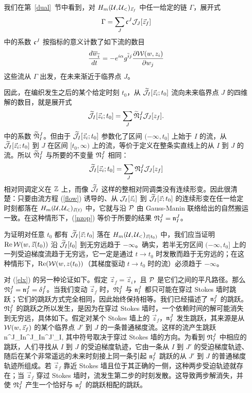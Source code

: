 我们在第~\ref{dual}~节中看到，对 $H_m(\U ,\U_<)_{\vec z_f}$ 中任一给定的链 $\Gamma$，展开式
\begin{equation}
\Gamma =\sum_J\frak{c}^J \J_J[\vec z_f]
\end{equation}
中的系数 $\frak{c}^J $ 按指标的意义计数了如下流的数目
\begin{equation}
\frac{d \bar w_{\bar i}}{dt} = -e^{i \alpha} g^{\bar i j}  \frac{\partial \W(w,z_i)}{\partial w_j}
\end{equation}
这些流从 $\Gamma$ 出发，在未来渐近于临界点 $J$。

因此，在编织发生之后的某个给定时刻 $t_0$，从 $\tilde \J_I[\vec z_i;t_0]$ 流向未来临界点 $J$ 的四维解的数目，就是展开式
\begin{equation} \label{ntop}
\tilde \J_I[\vec z_i;t_0] =\sum_J\tilde {\frak N}_I^J\J_J[z_f].
\end{equation}
中的系数 $\tilde{\frak N}^J_I$。但由于 $\tilde\J_I[\vec z_i;t_0]$ 参数化了区间 $(-\infty,t_0]$ 上始于 $I$ 的流，从 $\tilde\J_I[\vec z_i;t_0]$ 到 $J$ 在区间 $[t_0,\infty)$ 上的流，等价于定义在整条实直线上的从 $I$ 到 $J$ 的流。所以 $\tilde{\frak N}^J_I$ 与所要的不变量 $\frak N^J_I$ 相同：
\begin{equation} \label{nzop}
\tilde \J_I[\vec z_i;t_0] =\sum_J\frak N^J_I  \J_J[z_f]
\end{equation}
相对同调定义在 $\Z$ 上，而像 $\tilde\J_I$ 这样的整相对同调类没有连续形变。因此很清楚：只要由流方程 (\ref{flow}) 诱导的、从 $\J_I[\vec z_i]$ 到 $\tilde \J_I[\vec z;t_0]$ 的连续形变在任一给定时刻都落在 $H_m(\U ,\U_<)_{\vec z(t)}$ 中，它就与沿 $\P$ 由 Gauss-Manin 联络给出的自然搬运一致。在这种情形下，(\ref{nzop}) 等价于所要的结果 $\frak{N}^J_I = \frak{n}^J_I$。

为证明对任意 $t_0$ 都有 $\tilde\J_I[\vec z;t_0]$ 落在 $H_m(\U,\U_<)_{\vec z(t_0)}$ 中，我们应当证明 $\mathrm{Re}\,\W(w,\vec z(t_0))$ 沿 $\tilde \J_I[t_0]$ 到无穷远趋于 $-\infty$。确实，若半无穷区间 $(-\infty,t_0]$ 上的一列受迫梯度流趋于无穷远，它一定是通过 $t\to t_0$ 时发散而趋于无穷远的；在这种情形下，$\mathrm{Re}(\W(w,z(t_0))$（其梯度驱动 $t\to t_0$ 时的流）必须趋于 $-\infty$。

对 (\ref{elx}) 的另一种论证如下。假定 $\vec z_f=\vec z_i$，且 $\P$ 是它们之间的平凡路径。那么 $\frak N^J_I=\frak n^J_I=\delta^J_I$。当我们变动 $\vec z_f$ 时，$\frak N^J_I$ 与 $\frak n^J_I$ 都只可能在穿过 Stokes 墙时跳跃；它们的跳跃方式完全相同，因此始终保持相等。我们已经描述了 $\frak n^J_I$ 的跳跃。$\frak N^J_I$ 的跳跃之所以发生，是因为在穿过 Stokes 墙时，一个依赖时间的解可能消失到无穷远，具体如下。假定对某个 Stokes 墙上的 $\vec z_f$，$\frak n^J_I$ 发生跳跃，其来源是从 $\W(w,\vec z_f)$ 的某个临界点 $J'$ 到 $J$ 的一条普通梯度流。这样的流产生跳跃
\be\label{jumpo} \frak n^J_I\to \frak n^J_I\pm \frak n^{J'}_I,\ee
其中符号取决于穿过 Stokes 墙的方向。为看到 $\frak N^J_I$ 中相应的跳跃，人们寻找从 $I$ 到 $J$ 的受迫梯度轨迹，它由一条从 $I$ 到 $J'$ 的受迫梯度轨迹、随后在某个非常遥远的未来时刻接上同一条引起 $\frak n^J_I$ 跳跃的从 $J'$ 到 $J$ 的普通梯度轨迹所组成。若 $\vec z_f$ 靠近 Stokes 墙且位于其正确的一侧，这种两步受迫轨迹就存在；当 $\vec z_f$ 穿过 Stokes 墙时，流发生第二步的时刻发散。这导致两步解消失，并使 $\frak N^J_I$ 产生一个恰好与 $\frak n^J_I$ 的跳跃相配的跳跃。




